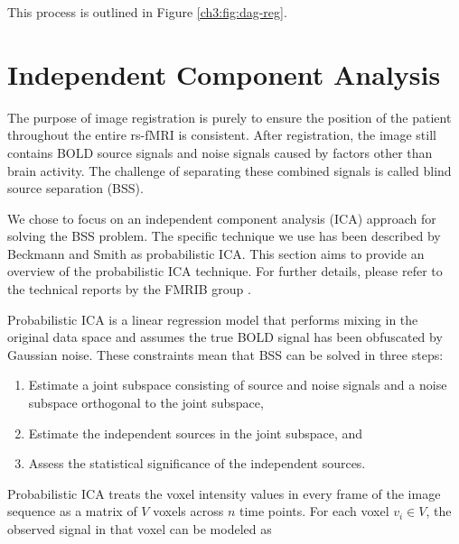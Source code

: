 { This process is outlined in Figure \ref{ch3:fig:dag-reg}.

\section{Independent Component Analysis} \label{section:ica}

The purpose of image registration is purely to ensure the position of the patient throughout the entire rs-fMRI is consistent. After registration, the image still contains BOLD source signals and noise signals caused by factors other than brain activity. The challenge of separating these combined signals is called blind source separation (BSS). 

We chose to focus on an independent component analysis (ICA) approach for solving the BSS problem. The specific technique we use has been described by Beckmann and Smith as probabilistic ICA. This section aims to provide an overview of the probabilistic ICA technique. For further details, please refer to the technical reports by the FMRIB group \cite{Beckmann2004} \cite{Woolrich2004} \cite{Beckmann} \cite{Smith2004}.

Probabilistic ICA is a linear regression model that performs mixing in the original data space and assumes the true BOLD signal has been obfuscated by Gaussian noise. These constraints mean that BSS can be solved in three steps:

\begin{enumerate}
\item Estimate a joint subspace consisting of source and noise signals and a noise subspace orthogonal to the joint subspace,
\item Estimate the independent sources in the joint subspace, and 
\item Assess the statistical significance of the independent sources.
\end{enumerate} 

Probabilistic ICA treats the voxel intensity values in every frame of the image sequence as a matrix of $V$ voxels across $n$ time points. For each voxel $v_i \in V$, the observed signal in that voxel can be modeled as

}
